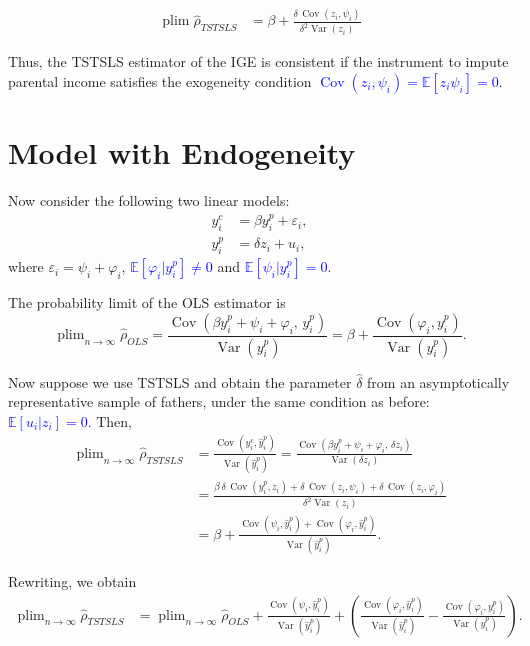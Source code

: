 \documentclass[12pt,oneside]{article}
\DeclareMathOperator*{\plim}{plim}
\theoremstyle{bracket}
\begin{document}
\begin{align*}
\plim\hat{\rho}_{TSTSLS} &= \beta+ \frac{\delta\,\operatorname{Cov}(z_i,\psi_i)}{\delta^2\operatorname{Var}(z_i)}
\end{align*}

Thus, the TSTSLS estimator of the IGE is consistent if the instrument to impute parental income satisfies the exogeneity condition \textcolor{blue}{$\operatorname{Cov}(z_i,\psi_i) = \mathbb{E}[z_i\psi_i]=0$}.

\section{Model with Endogeneity}

Now consider the following two linear models:
\begin{align}
    y_i^c &= \beta y_i^p + \varepsilon_i, \\
    y_i^p &= \delta z_i + u_i,
\end{align}
where $\varepsilon_i = \psi_i + \varphi_i$, \textcolor{blue}{$\mathbb{E}[\varphi_i|y_i^p] \neq 0$} and \textcolor{blue}{$\mathbb{E}[\psi_i|y_i^p] = 0$}.  

The probability limit of the OLS estimator is
\[
\plim_{n\to \infty}\hat{\rho}_{OLS}
= \frac{\operatorname{Cov}(\beta y_i^p + \psi_i + \varphi_i ,\, y_i^p)}{\operatorname{Var}(y_i^p)}
= \beta + \frac{\operatorname{Cov}(\varphi_i,y_i^p)}{\operatorname{Var}(y_i^p)}.
\]

Now suppose we use TSTSLS and obtain the parameter $\hat{\delta}$ from an asymptotically representative sample of fathers, under the same condition as before: \textcolor{blue}{$\mathbb{E}[u_i|z_i]=0$}. Then,
\begin{align*}
    \plim_{n\to \infty}\hat{\rho}_{TSTSLS}
    &= \frac{\operatorname{Cov}(y^c_i,\hat{y}_i^p)}{\operatorname{Var}(\hat{y}_i^p)} 
    = \frac{\operatorname{Cov}(\beta y_i^p + \psi_i + \varphi_i,\, \delta z_i)}{\operatorname{Var}(\delta z_i)} \\
    &= \frac{\beta\,\delta\,\operatorname{Cov}(y_i^p,z_i) + \delta\,\operatorname{Cov}(z_i,\psi_i) + \delta\,\operatorname{Cov}(z_i,\varphi_i)}{\delta^2\operatorname{Var}(z_i)} \\
    &= \beta + \frac{\operatorname{Cov}(\psi_i,\hat{y}_i^p) + \operatorname{Cov}(\varphi_i,\hat{y}_i^p)}{\operatorname{Var}(\hat{y}_i^p)}.
\end{align*}

Rewriting, we obtain
\begin{align*}
   \plim_{n\to \infty}\hat{\rho}_{TSTSLS} 
   &= \plim_{n\to \infty}\hat{\rho}_{OLS} 
   + \frac{\operatorname{Cov}(\psi_i,\hat{y}_i^p)}{\operatorname{Var}(\hat{y}_i^p)} 
   + \left( \frac{\operatorname{Cov}(\varphi_i,\hat{y}_i^p)}{\operatorname{Var}(\hat{y}_i^p)} - \frac{\operatorname{Cov}(\varphi_i,y_i^p)}{\operatorname{Var}(y_i^p)} \right).
\end{align*}
\end{document}
